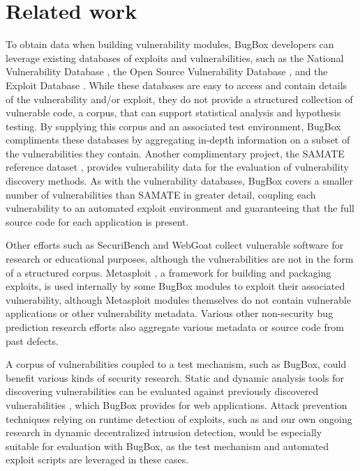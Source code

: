 \documentclass[letterpaper,twocolumn,10pt]{article}
\begin{document}
\section{Related work}
To obtain data when building vulnerability modules, BugBox developers can leverage existing databases of exploits and vulnerabilities, such as the National Vulnerability Database \cite{NVD}, the Open Source Vulnerability Database \cite{OSVDB}, and the Exploit Database \cite{exploitdb}. While these databases are easy to access and contain details of the vulnerability and/or exploit, they do not provide a structured collection of vulnerable code, a corpus, that can support statistical analysis and hypothesis testing. By supplying this corpus and an associated test environment, BugBox compliments these databases by aggregating in-depth information on a subset of the vulnerabilities they contain. Another complimentary project, the SAMATE reference dataset \cite{SAMATE}, provides vulnerability data for the evaluation of vulnerability discovery methods. As with the vulnerability databases, BugBox covers a smaller number of vulnerabilities than SAMATE in greater detail, coupling each vulnerability to an automated exploit environment and guaranteeing that the full source code for each application is present.

Other efforts such as SecuriBench \cite{livshits2005defining} and WebGoat \cite{webgoat} collect vulnerable software for research or educational purposes, although the vulnerabilities are not in the form of a structured corpus. Metasploit \cite{metasploit}, a framework for building and packaging exploits, is used internally by some BugBox modules to exploit their associated vulnerability, although Metasploit modules themselves do not contain vulnerable applications or other vulnerability metadata. Various other non-security bug prediction research efforts \cite{defectcorpus,eclipsebugdata} also aggregate various metadata or source code from past defects.

A corpus of vulnerabilities coupled to a test mechanism, such as BugBox, could benefit various kinds of security research. Static and dynamic analysis tools for discovering vulnerabilities \cite{onetechnique,antunes2009comparing} can be evaluated against previously discovered vulnerabilities \cite{bufferoverflowbenchmark}, which BugBox provides for web applications. Attack prevention techniques relying on runtime detection of exploits, such as \cite{commandinjection} and our own ongoing research in dynamic decentralized intrusion detection, would be especially suitable for evaluation with BugBox, as the test mechanism and automated exploit scripts are leveraged in these cases.
\end{document}
